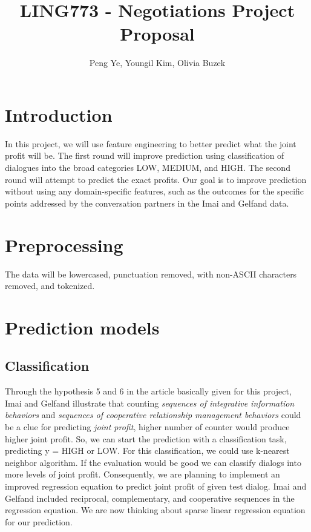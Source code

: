 \documentclass[11pt]{article} %
\title{LING773 - Negotiations Project Proposal}
\author{Peng Ye, Youngil Kim, Olivia Buzek}
\begin{document}
\maketitle

\section{Introduction} %

In this project, we will use feature engineering to better predict what the joint profit will be.  The first round will improve prediction using classification of dialogues into the broad categories LOW, MEDIUM, and HIGH.  The second round will attempt to predict the exact profits.  Our goal is to improve prediction without using any domain-specific features, such as the outcomes for the specific points addressed by the conversation partners in the Imai and Gelfand data.

\section{Preprocessing} %

The data will be lowercased, punctuation removed, with non-ASCII characters removed, and tokenized.

\section{Prediction models}

\subsection{Classification}
Through the hypothesis 5 and 6 in the article basically given for this project, Imai and Gelfand illustrate that counting \textit{sequences of integrative information behaviors} and \textit{sequences of cooperative relationship management behaviors} could be a clue for predicting \textit{joint profit}, higher number of counter would produce higher joint profit.
So, we can start the prediction with a classification task, predicting y = HIGH or LOW.  For this classification, we could use k-nearest neighbor algorithm. If the evaluation would be good we can classify dialogs into more levels of joint profit.\newline
Consequently, we are planning to implement an improved regression equation to predict joint profit of given test dialog. Imai and Gelfand included reciprocal, complementary, and cooperative sequences in the regression equation. We are now thinking about sparse linear regression equation for our prediction.
\end{document}
